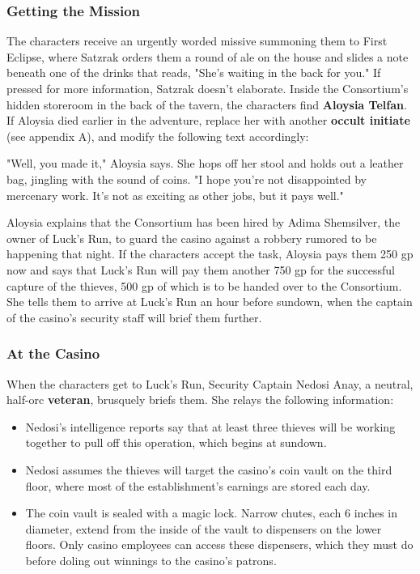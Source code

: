\documentclass[10pt,a4,twoside,twocolumn,openany,nodeprecatedcode]{dndbook}
\begin{document}
\subsubsection{Getting the Mission}
The characters receive an urgently worded missive summoning them to First Eclipse, where Satzrak orders them a round of ale on the house and slides a note beneath one of the drinks that reads, "She's waiting in the back for you." If pressed for more information, Satzrak doesn't elaborate.
Inside the Consortium's hidden storeroom in the back of the tavern, the characters find \textbf{Aloysia Telfan}. If Aloysia died earlier in the adventure, replace her with another \textbf{occult initiate} (see appendix A), and modify the following text accordingly:
\begin{DndReadAloud}{}
"Well, you made it," Aloysia says. She hops off her stool and holds out a leather bag, jingling with the sound of coins. "I hope you're not disappointed by mercenary work. It's not as exciting as other jobs, but it pays well."
\end{DndReadAloud}

Aloysia explains that the Consortium has been hired by Adima Shemsilver, the owner of Luck's Run, to guard the casino against a robbery rumored to be happening that night.
If the characters accept the task, Aloysia pays them 250 gp now and says that Luck's Run will pay them another 750 gp for the successful capture of the thieves, 500 gp of which is to be handed over to the Consortium. She tells them to arrive at Luck's Run an hour before sundown, when the captain of the casino's security staff will brief them further.
\subsubsection{At the Casino}
When the characters get to Luck's Run, Security Captain Nedosi Anay, a neutral, half-orc \textbf{veteran}, brusquely briefs them. She relays the following information:
\begin{itemize}

\item Nedosi's intelligence reports say that at least three thieves will be working together to pull off this operation, which begins at sundown.
\item Nedosi assumes the thieves will target the casino's coin vault on the third floor, where most of the establishment's earnings are stored each day.
\item The coin vault is sealed with a magic lock. Narrow chutes, each 6 inches in diameter, extend from the inside of the vault to dispensers on the lower floors. Only casino employees can access these dispensers, which they must do before doling out winnings to the casino's patrons.
\end{itemize}
\end{document}
